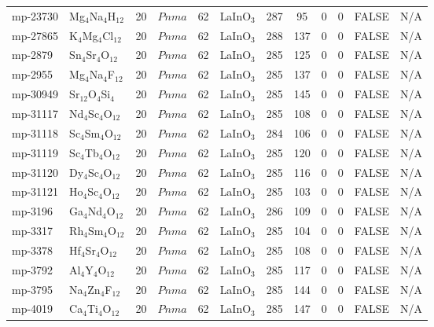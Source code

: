 {\begin{longtable}{llcccccccccc}
    mp-23730 & Mg$_{4}$Na$_{4}$H$_{12}$ & 20    & $Pnma$ & 62    & LaInO$_{3}$ & 287   & 95    & 0     & 0     & FALSE & N/A \\
    mp-27865 & K$_{4}$Mg$_{4}$Cl$_{12}$ & 20    & $Pnma$ & 62    & LaInO$_{3}$ & 288   & 137   & 0     & 0     & FALSE & N/A \\
    mp-2879 & Sn$_{4}$Sr$_{4}$O$_{12}$ & 20    & $Pnma$ & 62    & LaInO$_{3}$ & 285   & 125   & 0     & 0     & FALSE & N/A \\
    mp-2955 & Mg$_{4}$Na$_{4}$F$_{12}$ & 20    & $Pnma$ & 62    & LaInO$_{3}$ & 285   & 137   & 0     & 0     & FALSE & N/A \\
    mp-30949 & Sr$_{12}$O$_{4}$Si$_{4}$ & 20    & $Pnma$ & 62    & LaInO$_{3}$ & 285   & 145   & 0     & 0     & FALSE & N/A \\
    mp-31117 & Nd$_{4}$Sc$_{4}$O$_{12}$ & 20    & $Pnma$ & 62    & LaInO$_{3}$ & 285   & 108   & 0     & 0     & FALSE & N/A \\
    mp-31118 & Sc$_{4}$Sm$_{4}$O$_{12}$ & 20    & $Pnma$ & 62    & LaInO$_{3}$ & 284   & 106   & 0     & 0     & FALSE & N/A \\
    mp-31119 & Sc$_{4}$Tb$_{4}$O$_{12}$ & 20    & $Pnma$ & 62    & LaInO$_{3}$ & 285   & 120   & 0     & 0     & FALSE & N/A \\
    mp-31120 & Dy$_{4}$Sc$_{4}$O$_{12}$ & 20    & $Pnma$ & 62    & LaInO$_{3}$ & 285   & 116   & 0     & 0     & FALSE & N/A \\
    mp-31121 & Ho$_{4}$Sc$_{4}$O$_{12}$ & 20    & $Pnma$ & 62    & LaInO$_{3}$ & 285   & 103   & 0     & 0     & FALSE & N/A \\
    mp-3196 & Ga$_{4}$Nd$_{4}$O$_{12}$ & 20    & $Pnma$ & 62    & LaInO$_{3}$ & 286   & 109   & 0     & 0     & FALSE & N/A \\
    mp-3317 & Rh$_{4}$Sm$_{4}$O$_{12}$ & 20    & $Pnma$ & 62    & LaInO$_{3}$ & 285   & 104   & 0     & 0     & FALSE & N/A \\
    mp-3378 & Hf$_{4}$Sr$_{4}$O$_{12}$ & 20    & $Pnma$ & 62    & LaInO$_{3}$ & 285   & 108   & 0     & 0     & FALSE & N/A \\
    mp-3792 & Al$_{4}$Y$_{4}$O$_{12}$ & 20    & $Pnma$ & 62    & LaInO$_{3}$ & 285   & 117   & 0     & 0     & FALSE & N/A \\
    mp-3795 & Na$_{4}$Zn$_{4}$F$_{12}$ & 20    & $Pnma$ & 62    & LaInO$_{3}$ & 285   & 144   & 0     & 0     & FALSE & N/A \\
    mp-4019 & Ca$_{4}$Ti$_{4}$O$_{12}$ & 20    & $Pnma$ & 62    & LaInO$_{3}$ & 285   & 147   & 0     & 0     & FALSE & N/A \\

\end{longtable}}
